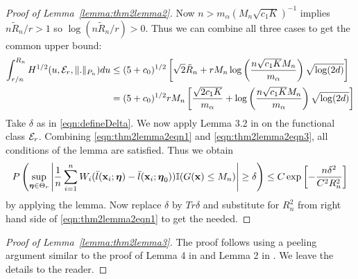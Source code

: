 \documentclass[11pt,letterpaper]{article}
\numberwithin{equation}{section}
\begin{document}
\begin{proof}[Proof of Lemma~\ref{lemma:thm2lemma2}]
Now $n > m_\alpha (M_n \sqrt{c_1 K})^{-1}$ implies $n \tilde R_n/r > 1$ so $\log(n \tilde R_n/r)>0$. Thus we can combine all three cases to get the common upper bound:
%
\begin{align}
\int_{r/n}^{R_n} H^{1/2} (u, {\cal{E}}_r, \|.\|_{P_n}) du & \leq
( 5 + c_0 )^{1/2} \left[ \sqrt 2 \tilde R_n + r M_n 
\log \left( \frac{n \sqrt{c_1 K} M_n}{m_\alpha} \right) \sqrt{ \log (2d)} \right] \notag\\
&= ( 5 + c_0 )^{1/2} r M_n \left[ \frac{ \sqrt{2 c_1 K}}{m_\alpha} + 
\log \left( \frac{n \sqrt{c_1 K} M_n}{m_\alpha} \right) \sqrt{ \log (2d)} \right]
\label{eqn:thm2lemma2eqn3}
\end{align}
%
Take $\delta$ as in \eqref{eqn:defineDelta}. We now apply Lemma 3.2 in \cite{vandeGeerBook00} on the functional class ${\cal{E}}_r$. Combining \eqref{eqn:thm2lemma2eqn1} and \eqref{eqn:thm2lemma2eqn3}, all conditions of the lemma are satisfied. Thus we obtain
%
$$
P \left( \sup_{{\boldsymbol{\eta}} \in \Theta_r} \left| \frac{1}{n} \sum_{i=1}^n W_i (\bar l({\bf{x}}_i; {\boldsymbol{\eta}}) -  \bar l( {\bf{x}}_i; {\boldsymbol{\eta}}_0)) {\mathbb{I}}(G({\bf{x}}) \leq M_n ) \right| \geq \delta \right) \leq
C \exp \left[ - \frac{n \delta^2}{ C^2 R_n^2} \right]
$$
%
by applying the lemma. Now replace $\delta$ by $Tr \delta$ and substitute for $R_n^2$ from right hand side of \eqref{eqn:thm2lemma2eqn1} to get the needed.
\end{proof}

\begin{proof}[Proof of Lemma~\ref{lemma:thm2lemma3}]
The proof follows using a peeling argument similar to the proof of Lemma 4 in \cite{FengSimon17} and Lemma 2 in \cite{StadlerEtal10}. We leave the details to the reader.
\end{proof}

%





\end{document}
